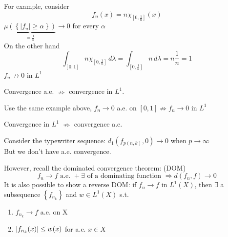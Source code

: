 \begin{example}
        For example, consider 
        \[ 
            f_n (x) = n \chi_{\left[0, \frac{1}{n} \right]}(x) 
        \]
        \( \underbrace{\mu \left( \left\{ |f_n| \geq \alpha \right\}\right)}_{= \frac{1}{n}} \to 0 \) for every \(\alpha\) \\
        On the other hand 
        \[ 
            \int _{\left[0, 1\right]} n \chi_{\left[0, \frac{1}{n} \right]} \, d\lambda 
            = \int_{\left[0, \frac{1}{n}\right]} n \, d\lambda 
            = n \frac{1}{n} = 1
        \]
        \( f_n \nrightarrow 0\) in \(L^1\) 
    
\end{example}
\begin{remark}
    Convergence a.e. \(\nRightarrow\) convergence in \(L^1\).
\end{remark}
\begin{example}    
    Use the same example above, \(f_n \rightarrow 0\) a.e. on \([0, 1] \nRightarrow f_n \rightarrow 0\) in \(L^1\)
\end{example}\begin{remark}
    Convergence in \(L^1\) \(\nRightarrow\) convergence a.e.
\end{remark} \begin{example}
    Consider the typewriter sequence: \( d_1(f_{p(n, k)}, 0) \to 0\) when \( p \to\infty\) \\
    But we don't have a.e. convergence. 

    However, recall the dominated convergence theorem: (DOM)
    \[ 
        f_n \rightarrow f \text{ a.e. } + \exists \text{ of a dominating function } \Rightarrow d(f_n, f)\rightarrow 0 
    \]
    It is also possible to show a reverse DOM: if \(f_n \to f \) in \(L^1(X)\), then \(\exists\) a subsequence \(\left\{f_{n_k}\right\}\) and \(w \in L^1(X)\) s.t. 
    \begin{enumerate}
        \item \(f_{n_k} \rightarrow f\) a.e. on X
        \item \( \abs{f_{n_k}(x)} \leq w(x) \) for a.e. \(x \in X\)
    \end{enumerate}
\end{example}